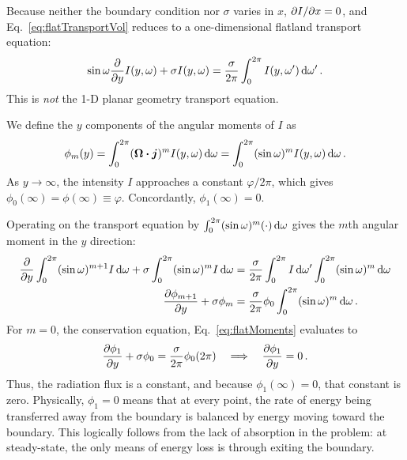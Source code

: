 Because neither the boundary condition nor $\sigma$ varies
in $x$, ${\partial I}/{\partial x}=0$, and Eq.~\eqref{eq:flatTransportVol} reduces to a
one-dimensional flatland transport equation:
\begin{equation}\label{eq:scatteringOnedFlatland}
  \sin \omega \frac{\partial }{\partial y}I(y,\omega) + \sigma I(y,\omega)
  = \frac{\sigma}{2\pi} \int_{0}^{2\pi} I(y,\omega') \mathop{}\!\mathrm{d} \omega'\,.
\end{equation}
This is \emph{not} the 1-D planar geometry transport equation.

We define the $y$ components of the angular moments of $I$ as
\begin{equation} \label{eq:flatPhi}
  \phi_m(y) = \int_{0}^{2\pi} (\bm{\Omega}\bm{\cdot}\bm{j})^m I(y,\omega) \mathop{}\!\mathrm{d}\omega
  = \int_{0}^{2\pi} (\sin\omega)^m I(y,\omega) \mathop{}\!\mathrm{d}\omega \,.
\end{equation}
As $y\to\infty$, the intensity $I$ approaches a constant $\varphi/2\pi$,
which gives $\phi_0(\infty)=\phi(\infty)\equiv\varphi$.
Concordantly, $\phi_1(\infty)=0$.

Operating on the transport equation by $\int_{0}^{2\pi} (\sin\omega)^m (\cdot)
\mathop{}\!\mathrm{d}\omega$ gives the $m$th angular moment in the $y$ direction:
\begin{align} \nonumber
  \frac{\partial }{\partial y} \int_{0}^{2\pi} (\sin\omega)^{m+1} I \mathop{}\!\mathrm{d}\omega
  + \sigma \int_{0}^{2\pi} (\sin\omega)^{m} I \mathop{}\!\mathrm{d}\omega
  &= \frac{\sigma}{2\pi} \int_{0}^{2\pi} I \mathop{}\!\mathrm{d} \omega'
  \int_{0}^{2\pi} (\sin\omega)^{m} \mathop{}\!\mathrm{d}\omega
  \\ \label{eq:flatMoments}
  \frac{\partial \phi_{m+1}}{\partial y}
  + \sigma \phi_{m}
  &= \frac{\sigma}{2\pi} \phi_{0}
  \int_{0}^{2\pi} (\sin\omega)^{m} \mathop{}\!\mathrm{d}\omega\,.
\end{align}
For $m=0$, the conservation equation, Eq.~\eqref{eq:flatMoments} evaluates to
\begin{equation*}
  \frac{\partial \phi_{1}}{\partial y}
  + \sigma \phi_{0}
  = \frac{\sigma}{2\pi} \phi_{0} (2\pi)
  \quad \Longrightarrow \quad
  \frac{\partial \phi_{1}}{\partial y} = 0\,.
\end{equation*}
Thus, the radiation flux is a constant, and because $\phi_1(\infty)=0$,
that constant is zero. Physically, $\phi_1=0$ means that at every
point, the rate of energy being transferred away from the boundary is balanced
by energy moving toward the boundary. This logically follows from the lack of
absorption in the problem: at steady-state, the only means of energy loss is
through exiting the boundary.


